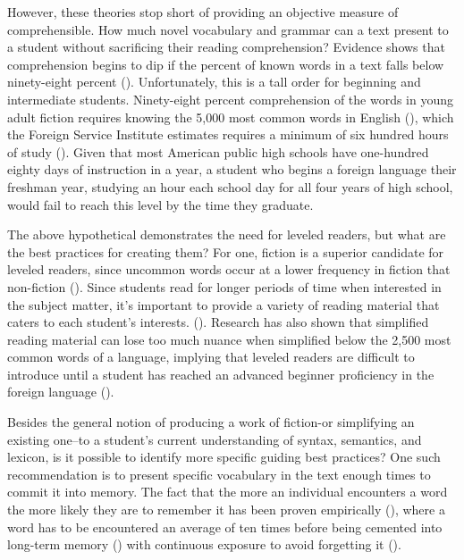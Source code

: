 \documentclass[
	letterpaper, %
]{jdf}
\newcommand{\pcite}[1]{(\cite{#1})}
\begin{document}
However, these theories stop short of providing an objective measure of comprehensible. How much novel vocabulary and grammar can a text present to a student without sacrificing their reading comprehension? Evidence shows that comprehension begins to dip if the percent of known words in a text falls below ninety-eight percent \pcite{hu_2000}. Unfortunately, this is a tall order for beginning and intermediate students. Ninety-eight percent comprehension of the words in young adult fiction requires knowing the 5,000 most common words in English \pcite{nation1992vocabulary}, which the Foreign Service Institute estimates requires a minimum of six hundred hours of study \pcite{fsi_language_learning}. Given that most American public high schools have one-hundred eighty days of instruction in a year, a student who begins a foreign language their freshman year, studying an hour each school day for all four years of high school, would fail to reach this level by the time they graduate.

The above hypothetical demonstrates the need for leveled readers, but what are the best practices for creating them? For one, fiction is a superior candidate for leveled readers, since uncommon words occur at a lower frequency in fiction that non-fiction \pcite{hu_2000}. Since students read for longer periods of time when interested in the subject matter, it's important to provide a variety of reading material that caters to each student's interests. \pcite{llm_augmented_exercise_retrieval}. Research has also shown that simplified reading material can lose too much nuance when simplified below the 2,500 most common words of a language, implying that leveled readers are difficult to introduce until a student has reached an advanced beginner proficiency in the foreign language \pcite{nation1992vocabulary}. 

Besides the general notion of producing a work of fiction-or simplifying an existing one–to a student's current understanding of syntax, semantics, and lexicon, is it possible to identify more specific guiding best practices? One such recommendation is to present specific vocabulary in the text enough times to commit it into memory. The fact that the more an individual encounters a word the more likely they are to remember it has been proven empirically \pcite{clockworkorange}, where a word has to be encountered an average of ten times before being cemented into long-term memory \pcite{Nation2020GradedRA} with continuous exposure to avoid forgetting it \pcite{cepedasrs}.
\end{document}
